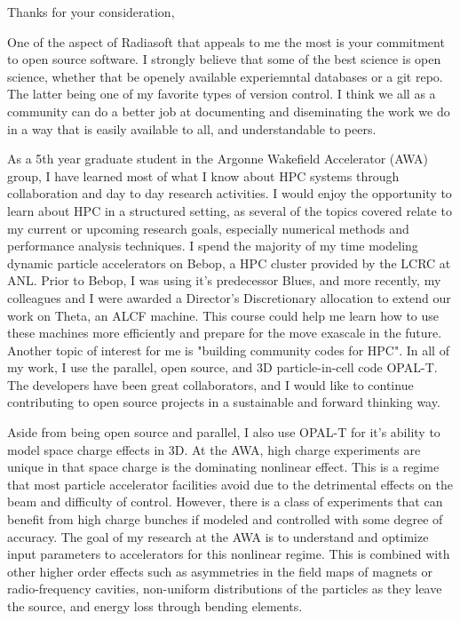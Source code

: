 \documentclass[11pt,a4paper,sans]{moderncv}        %
\begin{document}
\iftrue
{}
\date{April, 2018}
\opening{}
\closing{Thanks for your consideration,}
\makelettertitle
\vspace{-4em}


One of the aspect of Radiasoft that appeals to me the most is your commitment
to open source software. I strongly believe that some of the best science 
is open science, whether that be openely available experiemntal databases 
or a git repo. The latter being one of my favorite types of version control.
I think we all as a community can do a better job at documenting and 
diseminating the work we do in a way that is easily available to all, 
and understandable to peers.  


As a 5th year graduate student in the Argonne Wakefield Accelerator (AWA) group,
I have learned most of what I know about HPC systems through collaboration and
day to day research activities. I would enjoy the opportunity to learn about HPC in a structured setting, as several of the topics covered relate to my current or upcoming research goals, 
especially numerical methods and performance analysis techniques. 
I spend the majority of my time modeling  
dynamic particle accelerators on Bebop, a HPC cluster provided by the 
LCRC at ANL. Prior to Bebop, I was using it's predecessor Blues, and more recently,
my colleagues and I were awarded a Director's Discretionary
allocation to extend our work on Theta,
an ALCF machine.
This course could help me learn how to use these machines more efficiently 
and prepare for the move exascale in the future.
Another topic of interest for me is "building community codes for HPC". 
In all of my work, I use the parallel, open source, and
3D particle-in-cell code OPAL-T. The developers have been great collaborators, 
and I would like to continue contributing to open source projects in 
a sustainable and forward thinking way.

Aside from being open source and parallel, I also use OPAL-T for it's ability to model space charge effects in 3D.
At the AWA, high charge experiments are unique
in that space charge is the dominating nonlinear effect. This is a regime that most
particle accelerator facilities avoid due to the detrimental effects on the beam
and difficulty of control.
However, there is a class of experiments that can benefit from high charge bunches
if modeled and controlled with some degree of accuracy. The goal of my research
at the AWA is to understand and optimize input parameters to accelerators for
this nonlinear regime. This is combined with other higher order effects 
such as asymmetries in the field maps of magnets or radio-frequency cavities, 
non-uniform distributions of the particles as they leave the source, 
and energy loss through bending elements.
\end{document}
